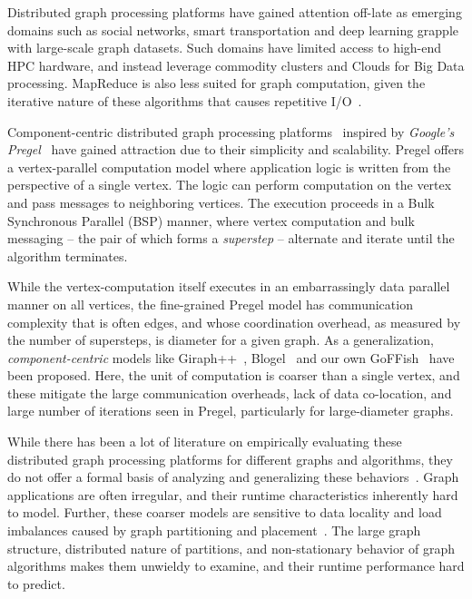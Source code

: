 \documentclass[10pt,conference, compsocconf]{IEEEtran}
\begin{document}
Distributed graph processing platforms have gained attention off-late as emerging domains such as social networks, smart transportation and deep learning grapple with large-scale graph datasets. Such domains have limited access to high-end HPC hardware, and instead leverage commodity clusters and Clouds for Big Data processing. MapReduce is also less suited for graph computation, given the iterative nature of these algorithms that causes repetitive I/O~\cite{graph-twiddling}. 

Component-centric distributed graph processing platforms~\cite{goffish,blogel,giraph++} inspired by \emph{Google's Pregel}~\cite{pregel} have gained attraction due to their simplicity and scalability. Pregel offers a vertex-parallel computation model where application logic is written from the perspective of a single vertex. The logic can perform computation on the vertex and pass messages to neighboring vertices. The execution proceeds in a Bulk Synchronous Parallel (BSP) manner, where vertex computation and bulk messaging -- the pair of which forms a \emph{superstep} -- alternate and iterate until the algorithm terminates. 


While the vertex-computation itself executes in an embarrassingly data parallel manner on all vertices, the fine-grained Pregel model has communication complexity that is often edges, and whose coordination overhead, as measured by the number of supersteps, is diameter for a given graph.
As a generalization, \emph{component-centric} models like Giraph++~\cite{giraph++}, Blogel~\cite{blogel} and our own GoFFish~\cite{goffish} have been proposed. Here, the unit of computation is coarser than a single vertex, and these mitigate the large communication overheads, lack of data co-location, and large number of iterations seen in Pregel, particularly for large-diameter graphs. 

While there has been a lot of literature on empirically evaluating these distributed graph processing platforms for different graphs and algorithms, they do not offer a formal basis of analyzing and generalizing these behaviors~\cite{lu2014large}. Graph applications are often irregular, and their runtime characteristics inherently hard to model. Further, these coarser models are sensitive to data locality and load imbalances caused by graph partitioning and placement~\cite{han2014experimental}. The large graph structure, distributed nature of partitions, and non-stationary behavior of graph algorithms makes them unwieldy to examine, and their runtime performance hard to predict.
\end{document}
